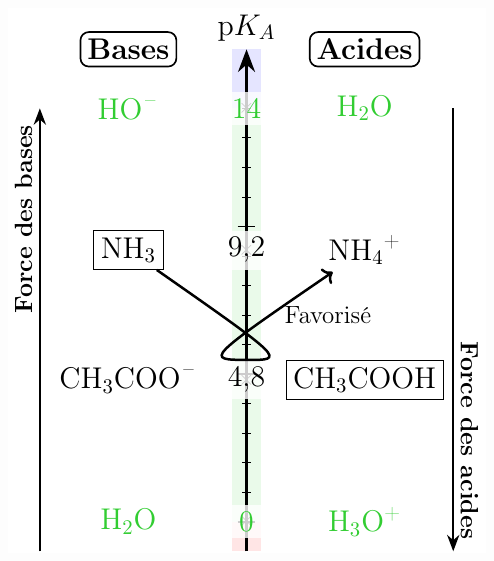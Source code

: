 \documentclass[../../main/main.tex]{subfiles}
\begin{document}
\begin{tcb*}
\begin{enumerate}[label=\sqenumi]
\begin{isd}
\begin{center}
{					      \includegraphics[width=.8\linewidth]{gamma_fav}
				      }
			      \end{center}
			      \tcblower
			      \begin{center}
\end{center}
\end{isd}
\end{enumerate}
\end{tcb*}
\end{document}
